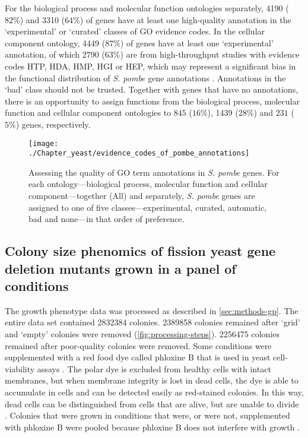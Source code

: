 For the biological process and molecular function ontologies separately, \num{4190} ($82\%$) and \num{3310} ($64\%$) of genes have at least one high-quality annotation in the `experimental' or `curated' classes of GO evidence codes. In the cellular component ontology, \num{4449} ($87\%$) of genes have at least one `experimental' annotation, of which \num{2790} ($63\%$) are from high-throughput studies with evidence codes HTP, HDA, HMP, HGI or HEP, which may represent a significant bias in the functional distribution of \emph{S. pombe} gene annotations \cite{Schnoes2013}. Annotations in the `bad' class should not be trusted. Together with genes that have no annotations, there is an opportunity to assign functions from the biological process, molecular function and cellular component ontologies to $845$ ($16\%$), \num{1439} ($28\%$) and $231$ ($5\%$) genes, respectively.

\begin{figure}[!hbt]
    \centering
    \texttt{[image: ./Chapter\_yeast/evidence\_codes\_of\_pombe\_annotations]}
    \caption{%
        Assessing the quality of GO term annotations in \emph{S. pombe} genes.
        For each ontology---biological process, molecular function and cellular component---together (All) and separately, \emph{S. pombe} genes are assigned to one of five classes---experimental, curated, automatic, bad and none---in that order of preference.
    }
    \label{fig:evidence_codes_of_pombe_annotations}
\end{figure}


\subsection{Colony size phenomics of fission yeast gene deletion mutants grown in a panel of conditions}

The growth phenotype data was processed as described in \ref{sec:methods-gp}. The entire data set contained \num{2832384} colonies. \num{2389858} colonies remained after `grid' and `empty' colonies were removed (\ref{fig:processing-steps}). \num{2256475} colonies remained after poor-quality colonies were removed. Some conditions were supplemented with a red food dye called phloxine B that is used in yeast cell-viability assays \cite{Noda2009}. The polar dye is excluded from healthy cells with intact membranes, but when membrane integrity is lost in dead cells, the dye is able to accumulate in cells and can be detected easily as red-stained colonies. In this way, dead cells can be distinguished from cells that are alive, but are unable to divide \cite{Mirisola2014}. Colonies that were grown in conditions that were, or were not, supplemented with phloxine B were pooled because phloxine B does not interfere with growth \cite{Kwolek-Mirek2014}.

